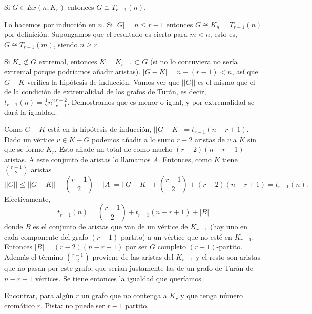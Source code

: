 \documentclass[TGyGC.tex]{subfiles}
\begin{document}
\begin{teorema}
Si $G\in Ex(n,K_r)$ entonces $G\cong T_{r-1}(n)$.
\end{teorema}
\begin{dem}
Lo hacemos por inducción en $n$. Si $|G|=n\leq r-1$ entonces $G\cong K_n=T_{r-1}(n)$ por definición. Supongamos que el resultado es cierto para $m<n$, esto es, $G\cong T_{r-1}(m)$, siendo $n\geq r$. 

Si $K_r\not\subset G$ extremal, entonces $K=K_{r-1}\subset G$ (si no lo contuviera no sería extremal porque podríamos añadir aristas). $|G-K|=n-(r-1)<n$, así que $G-K$ verifica la hipótesis de inducción. Vamos ver que $||G||$ es el mismo que el de la condición de extremalidad de los grafos de Turán, es decir, $t_{r-1}(n)=\frac{1}{2}n^2\frac{r-2}{r-1}$. Demostramos que es menor o igual, y por extremalidad se dará la igualdad.

Como $G-K$ está en la hipótesis de inducción, $||G-K||=t_{r-1}(n-r+1)$. Dado un vértice $v\in K-G$ podemos añadir a lo sumo $r-2$ aristas de $v$ a $K$ sin que se forme $K_r$. Esto añade un total de como mucho $(r-2)(n-r+1)$ aristas. A este conjunto de aristas lo llamamos $A$. Entonces, como $K$ tiene $\binom{r-1}{2}$ aristas
\[
||G||\leq ||G-K||+\binom{r-1}{2}+|A|=||G-K||+\binom{r-1}{2}+(r-2)(n-r+1)=t_{r-1}(n).
\] 
Efectivamente, 
\[
t_{r-1}(n)=\binom{r-1}{2}+t_{r-1}(n-r+1)+|B|
\]
donde $B$ es el conjunto de aristas que van de un vértice de $K_{r-1}$ (hay uno en cada componente del grafo $(r-1)$-partito) a un vértice que no esté en $K_{r-1}$. Entonces $|B|=(r-2)(n-r+1)$ por ser $G$ completo $(r-1)$-partito. Además el término $\binom{r-1}{2}$ proviene de las aristas del $K_{r-1}$ y el resto son aristas que no pasan por este grafo, que serían justamente las de un grafo de Turán de $n-r+1$ vértices. Se tiene entonces la igualdad que queríamos.
\end{dem}



\begin{ejer}
Encontrar, para algún $r$ un grafo que no contenga a $K_r$ y que tenga número cromático $r$. Pista: no puede ser $r-1$ partito. 
\end{ejer}
\end{document}
